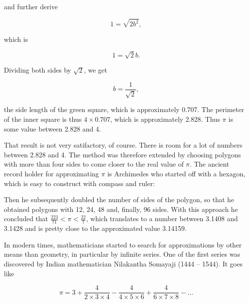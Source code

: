 \documentclass[tikz]{scrreprt}
\begin{document}
and further derive

\begin{equation}
1 = \sqrt{2b^2},
\end{equation}

which is

\begin{equation}
1 = \sqrt{2}b.
\end{equation}

Dividing both sides by $\sqrt{2}$, 
we get 

\begin{equation}
b = \frac{1}{\sqrt{2}},
\end{equation}

the side length of the green square, which is
approximately 0.707. The perimeter of
the inner square is thus $4 \times 0.707$,
which is approximately 2.828.
Thus $\pi$ is some value between 2.828 and 4.

That result is not very satifactory, of course.
There is room for a lot of numbers between
2.828 and 4. The method was therefore extended
by choosing polygons with more than four sides
to come closer to the real value of $\pi$.
The ancient record holder for approximating $\pi$
is Archimedes who started off with a hexagon,
which is easy to construct with compass and ruler:

\begin{center}
\end{center}

Then he subsequently doubled the number of sides
of the polygon, so that he obtained polygons with
12, 24, 48 and, finally, 96 sides. With this approach
he concluded that $\frac{223}{71} < \pi < \frac{22}{7}$,
which translates to a number between 3.1408 and 3.1428
and is pretty close to the approximated value 3.14159.

In modern times, mathematicians started to search
for approximations by other means than geometry,
in particular by infinite series. One of the first series
was discovered by Indian mathematician Nilakantha Somayaji
(1444 -- 1544). It goes like

\begin{equation}
  \pi = 3 + \frac{4}{2\times 3 \times 4} -
            \frac{4}{4\times 5 \times 6} +
            \frac{4}{6\times 7 \times 8} -
            \dots
\end{equation}
\end{document}
